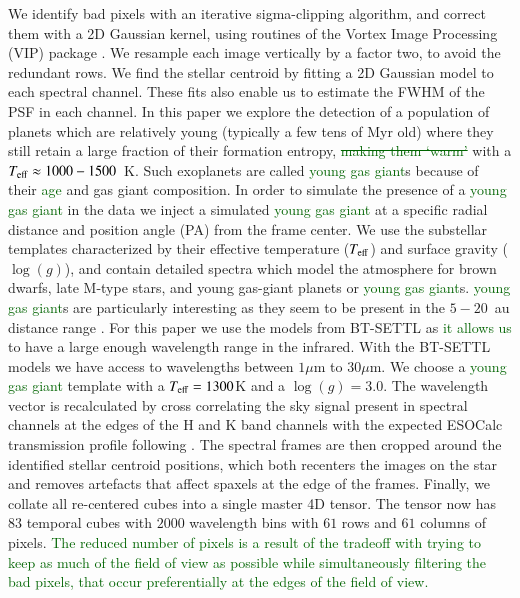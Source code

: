\documentclass[referee]{aa} %
\newcommand{\newchange}[1]{\textcolor{darkgreen}{#1}}
\begin{document}
We identify bad pixels with an iterative sigma-clipping algorithm, and correct them with a 2D Gaussian kernel, using routines of the Vortex Image Processing (\textsc{VIP}) package \citep{2017AJGomezVIP,2023Christiaens}.
We resample each image vertically by a factor two, to avoid the redundant rows. 
We find the stellar centroid by fitting a 2D Gaussian model to each spectral channel. 
These fits also enable us to estimate the FWHM of the PSF in each channel. 
In this paper we explore the detection of a population of planets which are relatively young (typically a few tens of Myr old) where they still retain a large fraction of their formation entropy, \newchange{\sout{making them `warm'}} with a $T_{\rm eff}\approx 1000 - 1500$~K.
Such exoplanets are called \newchange{young gas giant}s because of their \newchange{age} and gas giant composition.
In order to simulate the presence of a \newchange{young gas giant} in the data we inject a simulated \newchange{young gas giant} at a specific radial distance and position angle (PA) from the frame center.
We use the substellar templates characterized by their effective temperature ($T_{\rm{eff}}$) and surface gravity ($\log(g)$), and contain detailed spectra which model the atmosphere for brown dwarfs, late M-type stars, and young gas-giant planets or \newchange{young gas giant}s.
\newchange{young gas giant}s are particularly interesting as they seem to be present in the $5-20$~au distance range \cite{2016Bryan}.
For this paper we use the models from BT-SETTL as \newchange{it allows us} to have a large enough wavelength range in the infrared. 
With the BT-SETTL models we have access to wavelengths between $1\mu$m to $30\mu$m.
We choose a \newchange{young gas giant} template with a $T_{\rm eff} = 1300$K and a $\log(g)=3.0$.
The wavelength vector is recalculated by cross correlating the sky signal present in spectral channels at the edges of the H and K band channels with the expected ESOCalc transmission profile following \cite{2018AHoeijmakersMM}. 
The spectral frames are then cropped around the identified stellar centroid positions, which both recenters the images on the star and removes artefacts that affect spaxels at the edge of the frames.
Finally, we collate all re-centered cubes into a single master 4D tensor.
The tensor now has $83$ temporal cubes with $2000$ wavelength bins with $61$ rows and $61$ columns of pixels.
\newchange{The reduced number of pixels is a result of the tradeoff with trying to keep as much of the field of view as possible while simultaneously filtering the bad pixels, that occur preferentially at the edges of the field of view.}
\end{document}
